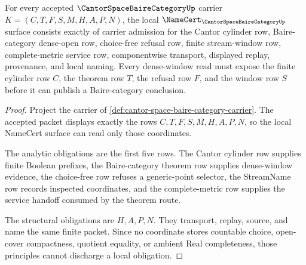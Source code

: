 \begin{theorem}
\label{thm:cantor-space-baire-category-namecert-obligations}
For every accepted $\CantorSpaceBaireCategoryUp$ carrier $K=(C,T,F,S,M,H,A,P,N)$, the local $\NameCert_{\CantorSpaceBaireCategoryUp}$ surface consists exactly of carrier admission for the Cantor cylinder row, Baire-category dense-open row, choice-free refusal row, finite stream-window row, complete-metric service row, componentwise transport, displayed replay, provenance, and local naming. Every dense-window read must expose the finite cylinder row $C$, the theorem row $T$, the refusal row $F$, and the window row $S$ before it can publish a Baire-category conclusion.
\end{theorem}
\begin{proof}
Project the carrier of \autoref{def:cantor-space-baire-category-carrier}. The accepted packet displays exactly the rows $C,T,F,S,M,H,A,P,N$, so the local NameCert surface can read only those coordinates.

The analytic obligations are the first five rows. The Cantor cylinder row supplies finite Boolean prefixes, the Baire-category theorem row supplies dense-window evidence, the choice-free row refuses a generic-point selector, the StreamName row records inspected coordinates, and the complete-metric row supplies the service handoff consumed by the theorem route.

The structural obligations are $H,A,P,N$. They transport, replay, source, and name the same finite packet. Since no coordinate stores countable choice, open-cover compactness, quotient equality, or ambient Real completeness, those principles cannot discharge a local obligation.
\end{proof}

